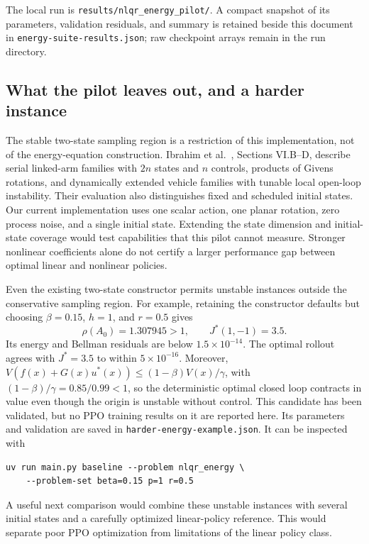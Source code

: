 \documentclass[11pt]{article}
\begin{document}
The local run is \texttt{results/nlqr\_energy\_pilot/}. A compact snapshot of its
parameters, validation residuals, and summary is retained beside this document in
\texttt{energy-suite-results.json}; raw checkpoint arrays remain in the run directory.


\subsection{What the pilot leaves out, and a harder instance}
\label{sec:harder-problems}

The stable two-state sampling region is a restriction of this implementation, not
of the energy-equation construction. Ibrahim et al.~\cite{ibrahim2026},
Sections VI.B--D, describe serial linked-arm families with $2n$ states and $n$
controls, products of Givens rotations, and dynamically extended vehicle families
with tunable local open-loop instability. Their evaluation also distinguishes fixed
and scheduled initial states. Our current implementation uses one scalar action,
one planar rotation, zero process noise, and a single initial state. Extending the
state dimension and initial-state coverage would test capabilities that this pilot
cannot measure. Stronger nonlinear coefficients alone do not certify a larger
performance gap between optimal linear and nonlinear policies.

Even the existing two-state constructor permits unstable instances outside the
conservative sampling region. For example, retaining the constructor defaults but
choosing $\beta=0.15$, $h=1$, and $r=0.5$ gives
\[
 \rho(A_0)=1.307945>1,\qquad J^*(1,-1)=3.5.
\]
Its energy and Bellman residuals are below $1.5\times10^{-14}$.
The optimal rollout agrees with $J^*=3.5$ to within $5\times10^{-16}$. Moreover,
$V(f(x)+G(x)u^*(x))\leq (1-\beta)V(x)/\gamma$, with
$(1-\beta)/\gamma=0.85/0.99<1$, so the deterministic optimal closed loop contracts
in value even though the origin is unstable without control. This candidate has
been validated, but no PPO training results on it are reported here. Its parameters
and validation are saved in \texttt{harder-energy-example.json}. It can be inspected with
\begin{verbatim}
uv run main.py baseline --problem nlqr_energy \
    --problem-set beta=0.15 p=1 r=0.5
\end{verbatim}
A useful next comparison would combine these unstable instances with several initial
states and a carefully optimized linear-policy reference. This would separate poor
PPO optimization from limitations of the linear policy class.
\end{document}
